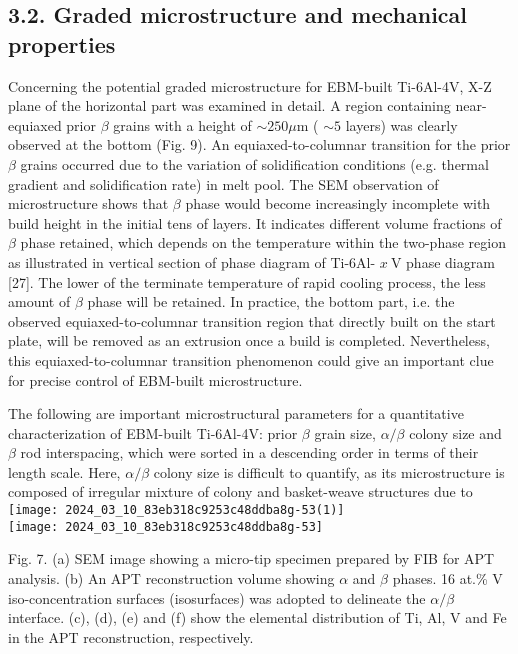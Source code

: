 \documentclass[10pt]{article}
\begin{document}
\subsection*{3.2. Graded microstructure and mechanical properties}
Concerning the potential graded microstructure for EBM-built Ti-6Al-4V, X-Z plane of the horizontal part was examined in detail. A region containing near-equiaxed prior $\beta$ grains with a height of $\sim 250 \mu \mathrm{m}$ ( $\sim 5$ layers) was clearly observed at the bottom (Fig. 9). An equiaxed-to-columnar transition for the prior $\beta$ grains occurred due to the variation of solidification conditions (e.g. thermal gradient and solidification rate) in melt pool. The SEM observation of microstructure shows that $\beta$ phase would become increasingly incomplete with build height in the initial tens of layers. It indicates different volume fractions of $\beta$ phase retained, which depends on the temperature within the two-phase region as illustrated in vertical section of phase diagram of Ti-6Al- $x \mathrm{~V}$ phase diagram [27]. The lower of the terminate temperature of rapid cooling process, the less amount of $\beta$ phase will be retained. In practice, the bottom part, i.e. the observed equiaxed-to-columnar transition region that directly built on the start plate, will be removed as an extrusion once a build is completed. Nevertheless, this equiaxed-to-columnar transition phenomenon could give an important clue for precise control of EBM-built microstructure.

The following are important microstructural parameters for a quantitative characterization of EBM-built Ti-6Al-4V: prior $\beta$ grain size, $\alpha / \beta$ colony size and $\beta$ rod interspacing, which were sorted in a descending order in terms of their length scale. Here, $\alpha / \beta$ colony size is difficult to quantify, as its microstructure is composed of irregular mixture of colony and basket-weave structures due to\\
\texttt{[image: 2024\_03\_10\_83eb318c9253c48ddba8g-53(1)]}\\
\texttt{[image: 2024\_03\_10\_83eb318c9253c48ddba8g-53]}

Fig. 7. (a) SEM image showing a micro-tip specimen prepared by FIB for APT analysis. (b) An APT reconstruction volume showing $\alpha$ and $\beta$ phases. 16 at.\% V iso-concentration surfaces (isosurfaces) was adopted to delineate the $\alpha / \beta$ interface. (c), (d), (e) and (f) show the elemental distribution of Ti, Al, V and Fe in the APT reconstruction, respectively.
\end{document}
